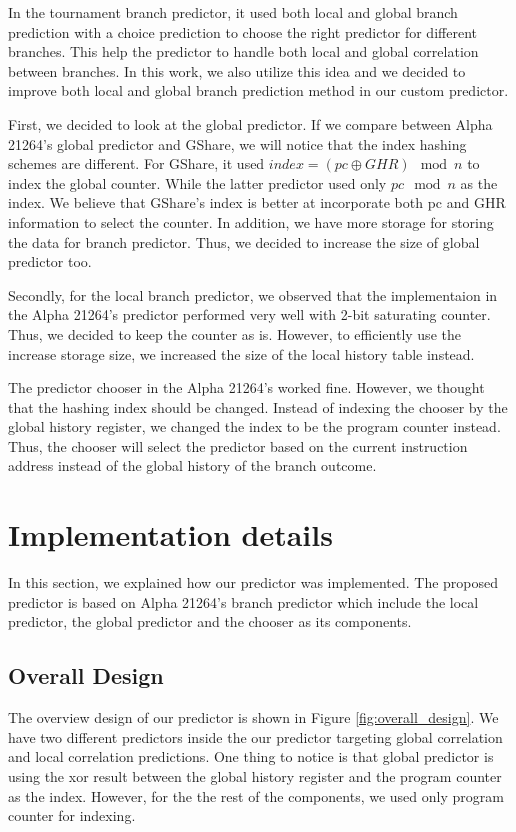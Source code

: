 \documentclass[conference]{IEEEtran}
\begin{document}
In the tournament branch predictor, it used both local and global branch prediction
with a choice prediction to choose the right predictor for different branches.
This help the predictor to handle both local and global correlation between branches.
In this work, we also utilize this idea and we decided to improve both local and global
branch prediction method in our custom predictor.

First, we decided to look at the global predictor. If we compare between Alpha 21264's
global predictor and GShare, we will notice that the index hashing schemes are different.
For GShare, it used $index = (pc \oplus GHR) \mod{n}$ to index the global counter. While the latter
predictor used only $pc \mod{n}$ as the index. We believe that GShare's index is better
at incorporate both pc and GHR information to select the counter. In addition, we have more
storage for storing the data for branch predictor. Thus, we decided to increase the size of
global predictor too.

Secondly, for the local branch predictor, we observed that the implementaion in the
Alpha 21264's predictor performed very well with 2-bit saturating counter. Thus, we decided
to keep the counter as is. However, to efficiently use the increase storage size, we increased
the size of the local history table instead.

The predictor chooser in the Alpha 21264's worked fine. However, we thought that the hashing
index should be changed. Instead of indexing the chooser by the global history register,
we changed the index to be the program counter instead. Thus, the chooser will select the
predictor based on the current instruction address instead of the global
history of the branch outcome.

\section{Implementation details}

In this section, we explained how our predictor was implemented. The proposed predictor is
based on Alpha 21264's branch predictor which include the local predictor, the global predictor
and the chooser as its components.

\subsection{Overall Design}

The overview design of our predictor is shown in Figure \ref{fig:overall_design}. We have two different
predictors inside the our predictor targeting global correlation and local correlation predictions.
One thing to notice is that global predictor is using the xor result between the global history register
and the program counter as the index. However, for the the rest of the components, we used only program
counter for indexing.
\end{document}
